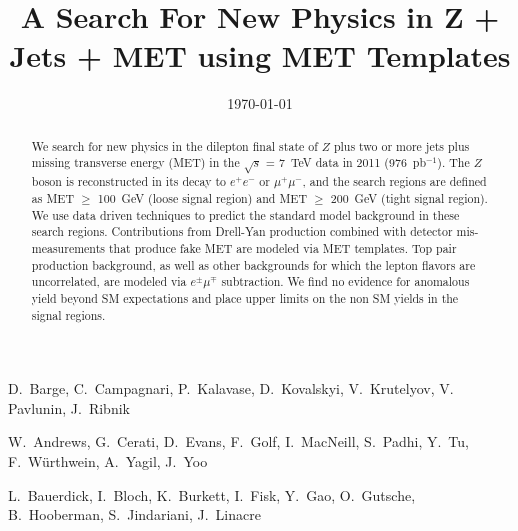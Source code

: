 \documentclass{cmspaper}
\newcommand{\Z}{$Z$ } %
\newcommand{\lumi}{976~pb$^{-1}$}
\newcommand{\signalmetl}{100}
\newcommand{\signalmett}{200}
\begin{document}
\begin{titlepage}


  \date{\today}
 
  \title{A Search For New Physics in Z + Jets + MET using MET Templates}

  \begin{Authlist}
    D.~Barge, C.~Campagnari, P.~Kalavase, D.~Kovalskyi, V.~Krutelyov, V. Pavlunin, J.~Ribnik

    W.~Andrews, G.~Cerati, D.~Evans, F.~Golf, I.~MacNeill, S.~Padhi, Y.~Tu, F.~W\"urthwein, 
	A.~Yagil, J.~Yoo

	L.~Bauerdick, I.~Bloch, K.~Burkett, I.~Fisk, Y.~Gao, O.~Gutsche, B.~Hooberman, 
	S.~Jindariani, J.~Linacre
  \end{Authlist}

  \begin{abstract}

\begin{comment}

We search for new physics in the dilepton final state of Z plus two or more jets plus missing transverse 
energy (MET) in the $\sqrt{s}$ = 7~TeV data in 2011 (204~pb$^{-1}$). 
The Z boson is reconstructed in its decay to $e^+e^-$ or $\mu^+\mu^-$, and
the search regions are defined as MET $\ge$ 100 GeV (loose signal region) and 
MET $\ge$ 200 GeV (tight signal region). 
We use data driven techniques to predict the standard model background in these
search regions. 
Contributions from Drell-Yan production combined with detector mis-measurements that produce 
fake MET are modeled via MET templates.
Top pair production background, as well as other backgrounds for which the lepton
flavors are uncorrelated, are modeled via $e^\pm\mu^\mp$ subtraction.
We find no evidence
for anomalous yield beyond SM expectations and place upper limits
on the non SM yields in the signal regions.

\end{comment}


We search for new physics in the dilepton final state of \Z plus two or more jets plus missing transverse 
energy (MET) in the $\sqrt{s}$ = 7~TeV data in 2011 (\lumi). 
The \Z boson is reconstructed in its decay to $e^+e^-$ or $\mu^+\mu^-$, and
the search regions are defined as MET $\ge$ \signalmetl~GeV (loose signal region) and 
MET $\ge$ \signalmett~GeV (tight signal region). 
We use data driven techniques to predict the standard model background in these
search regions. 
Contributions from Drell-Yan production combined with detector mis-measurements that produce 
fake MET are modeled via MET templates.
Top pair production background, as well as other backgrounds for which the lepton
flavors are uncorrelated, are modeled via $e^\pm\mu^\mp$ subtraction.
We find no evidence
for anomalous yield beyond SM expectations and place upper limits
on the non SM yields in the signal regions.



\end{abstract}
\end{titlepage}
\end{document}

